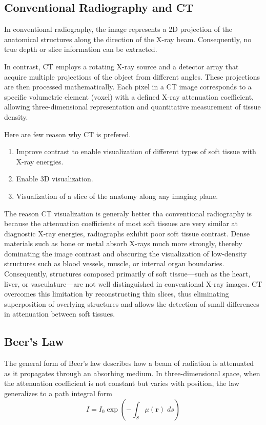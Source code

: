 \documentclass[../../../main.tex]{subfiles}
\begin{document}
\subsection{Conventional Radiography and CT}
In conventional radiography, the image represents a 2D projection of the anatomical structures along the direction of the X-ray beam.
Consequently, no true depth or slice information can be extracted.

In contrast, CT employs a rotating X-ray source and a detector array that acquire multiple projections of the object from different angles.
These projections are then processed mathematically.
Each pixel in a CT image corresponds to a specific volumetric element (voxel) with a defined X-ray attenuation coefficient, allowing three-dimensional representation and quantitative measurement of tissue density.

Here are few reason why CT is prefered.
\begin{enumerate}
    \item Improve contrast to enable visualization of different types of soft tissue with X-ray energies.
    \item Enable 3D visualization.
    \item Visualization of a slice of the anatomy along any imaging plane.
\end{enumerate}

The reason CT visualization is generaly better tha conventional radiography is because the attenuation coefficients of most soft tissues are very similar at diagnostic X-ray energies, radiographs exhibit poor soft tissue contrast.
Dense materials such as bone or metal absorb X-rays much more strongly, thereby dominating the image contrast and obscuring the visualization of low-density structures such as blood vessels, muscle, or internal organ boundaries.
Consequently, structures composed primarily of soft tissue—such as the heart, liver, or vasculature—are not well distinguished in conventional X-ray images.
CT overcomes this limitation by reconstructing thin slices, thus eliminating superposition of overlying structures and allows the detection of small differences in attenuation between soft tissues.

\subsection{Beer's Law}
The general form of Beer’s law describes how a beam of radiation is attenuated as it propagates through an absorbing medium.
In three-dimensional space, when the attenuation coefficient is not constant but varies with position, the law generalizes to a path integral form
\begin{equation*}
    I=I_0\exp \left( -\int_S \mu(\mathbf{r })\;ds \right)
\end{equation*}
\end{document}
